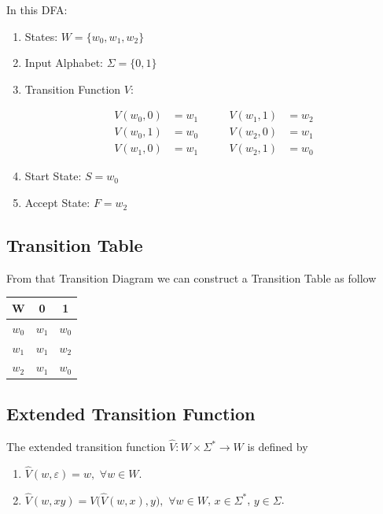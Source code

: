 \documentclass[12pt,a4paper,openany]{article}
\begin{document}
In this DFA: 

\begin{enumerate}
    \item States: $W = \{w_0, w_1, w_2\}$
    \item Input Alphabet: $\Sigma = \{0, 1\}$
    \item Transition Function $V$:
    
    \[
    \begin{aligned}
        V(w_0, 0) &= w_1 \qquad & V(w_1, 1) &= w_2 \\
        V(w_0, 1) &= w_0 \qquad & V(w_2, 0) &= w_1 \\
        V(w_1, 0) &= w_1 \qquad & V(w_2, 1) &= w_0
    \end{aligned}
    \]

    \item Start State: $S = w_0$
    \item Accept State: $F = w_2$
\end{enumerate}

\subsection{Transition Table}

From that Transition Diagram we can construct a Transition Table as follow

\begin{center}
\begin{tabular}{c|cc} 
\textbf{W} & \textbf{0} & \textbf{1} \\ 
\hline $w_0$ & $w_1$ & $w_0$ 
\\ $w_1$ & $w_1$ & $w_2$ \\ 
$w_2$ & $w_1$ & $w_0$ \\ 
\end{tabular}
\end{center}

\subsection{Extended Transition Function}

The extended transition function $\hat{V}: W \times \Sigma^* \to W$ is defined by
\begin{enumerate}
    \item $\hat{V}(w,\varepsilon)=w,$ $\forall w\in W$.
    \item $\hat{V}(w,xy)=V\big(\hat{V}(w,x),y\big),$  $\forall w\in W$, $x\in\Sigma^*$, $y\in\Sigma$.
\end{enumerate}
\end{document}
